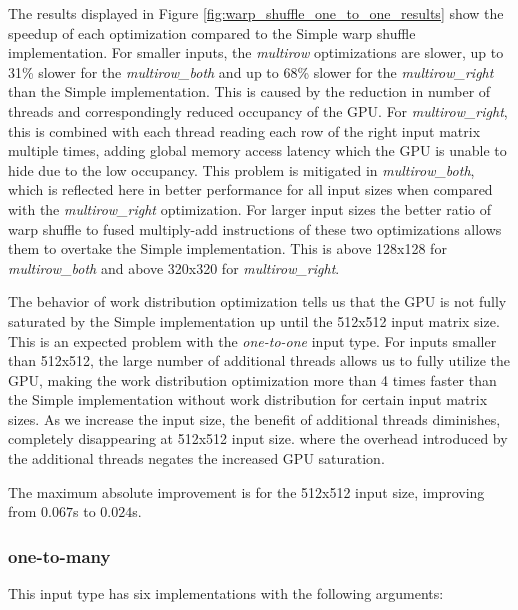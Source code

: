 The results displayed in Figure \ref{fig:warp_shuffle_one_to_one_results} show the speedup of each optimization compared to the Simple warp shuffle implementation. For smaller inputs, the \textit{multirow} optimizations are slower, up to 31\% slower for the \textit{multirow\_both} and up to 68\% slower for the \textit{multirow\_right} than the Simple implementation. This is caused by the reduction in number of threads and correspondingly reduced occupancy of the GPU. For \textit{multirow\_right}, this is combined with each thread reading each row of the right input matrix multiple times, adding global memory access latency which the GPU is unable to hide due to the low occupancy. This problem is mitigated in \textit{multirow\_both}, which is reflected here in better performance for all input sizes when compared with the \textit{multirow\_right} optimization. For larger input sizes the better ratio of warp shuffle to fused multiply-add instructions of these two optimizations allows them to overtake the Simple implementation. This is above 128x128 for \textit{multirow\_both} and above 320x320 for \textit{multirow\_right}.

The behavior of work distribution optimization tells us that the GPU is not fully saturated by the Simple implementation up until the 512x512 input matrix size. This is an expected problem with the \textit{one-to-one} input type. For inputs smaller than 512x512, the large number of additional threads allows us to fully utilize the GPU, making the work distribution optimization more than 4 times faster than the Simple implementation without work distribution for certain input matrix sizes. As we increase the input size, the benefit of additional threads diminishes, completely disappearing at 512x512 input size. where the overhead introduced by the additional threads negates the increased GPU saturation. 

The maximum absolute improvement is for the 512x512 input size, improving from $0.067$s to $0.024$s.


\subsubsection{one-to-many}
This input type has six implementations with the following arguments:

